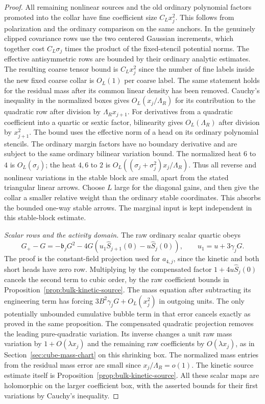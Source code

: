 \documentclass[11pt]{article}
\theoremstyle{definition}
\begin{document}
\begin{proof}
All remaining nonlinear sources and the old ordinary
polynomial factors promoted into the collar have fine
coefficient size \(C_Lx_j^2\). This follows from
polarization and the ordinary comparison on the same
anchors. In the genuinely clipped covariance rows use the
two centered Gaussian increments, which together cost
\(C_L\sigma_j\) times the product of the fixed-stencil
potential norms. The effective antisymmetric rows are
bounded by their ordinary analytic estimates. The resulting
coarse tensor bound is \(C_Lx_j^2\) since the number of
fine labels inside the new fixed coarse collar is \(O_L(1)\)
per coarse label. The same statement holds for the residual
mass after its common linear density has been removed.
Cauchy's inequality in the normalized boxes gives
\(O_L(x_j/\Lambda_R)\) for its contribution to the
quadratic row after division by \(\Lambda_R x_{j+1}\).
For derivatives from a quadratic coefficient into a
quartic or sextic factor, bilinearity gives \(O_L(\Lambda_R)\)
after division by \(x_{j+1}^2\). The bound uses the effective
norm of a head on its ordinary polynomial stencils. The
ordinary margin factors have no boundary derivative and
are subject to the same ordinary bilinear variation bound.
The normalized heat \(6\) to \(4\) is \(O_L(\sigma_j)\);
the heat \(4,6\) to \(2\) is
\(O_L((\sigma_j+\sigma_j^2)x_j/\Lambda_R)\).
Thus all reverse and nonlinear variations in the stable
block are small, apart from the stated triangular
linear arrows. Choose \(L\) large for the diagonal
gains, and then give the collar a smaller relative weight
than the ordinary stable coordinates. This absorbs the
bounded one-way stable arrows. The marginal input is kept
independent in this stable-block estimate.

\emph{Scalar rows and the activity domain.}
The raw ordinary scalar quartic obeys
\begin{equation}
 G_+-G=-\mathfrak b_jG^2-4G(u_1\widehat S_{j+1}(0)
                                          -u\widehat S_j(0)),
 \qquad u_1=u+3\gamma_jG .
\end{equation}
The proof is the constant-field projection used for \(a_{4,j}\),
since the kinetic and both short heads have zero row.
Multiplying by the compensated factor
\(1+4u\widehat S_j(0)\) cancels the second term to cubic
order, by the raw coefficient bounds in
Proposition~\ref{prop:bulk-kinetic-source}. The mass
equation after subtracting its engineering term has forcing
\(3B^2\gamma_jG+O_L(x_j^2)\) in outgoing units.
The only potentially unbounded cumulative bubble term
in that error cancels exactly as proved in the same
proposition. The compensated quadratic projection removes
the leading pure-quadratic variation. Its inverse changes
a unit raw mass variation by \(1+O(\lambda x_j)\) and the
remaining raw coefficients by \(O(\lambda x_j)\), as in
Section~\ref{sec:cube-mass-chart} on this shrinking box.
The normalized mass entries from the residual mass error
are small since \(x_j/\Lambda_R=o(1)\). The kinetic
source estimate itself is Proposition~\ref{prop:bulk-kinetic-source}.
All these scalar maps are holomorphic on the larger
coefficient box, with the asserted bounds for their
first variations by Cauchy's inequality.


\end{proof}
\end{document}
